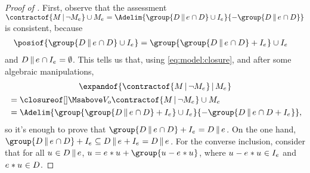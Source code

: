 \documentclass[preprint]{isipta2025}
\begin{document}
\begin{proof}[Proof of ]
First, observe that the assessment \(\contractof{\M\given\neg\eventM}\union\eventM=\Adelim{\group{\desirset\altcondon\eventopt\cap\desirset}\cup\eventindifset}{-\group{\desirset\altcondon\eventopt\cap\desirset}}\) is consistent, because
\begin{align*}
\posiof{\group{\desirset\altcondon\eventopt\cap\desirset}\cup\eventindifset}
&=\group{\group{\desirset\altcondon\eventopt\cap\desirset}+\eventindifset}\cup\eventindifset
\end{align*}
and \(\desirset\altcondon\eventopt\cap\eventindifset=\emptyset\).
This tells us that, using \cref{eq:model:closure}, and after some algebraic manipulations,
\begin{multline*}
\expandof{\contractof{\M\given\neg\eventM}\given\eventM}\\
\begin{aligned}
&=\Mclsbgof{\zeroM}{\contractof{\M\given\neg\eventM}\union\eventM}\\
&=\Adelim{\group{\group{\desirset\altcondon\eventopt\cap\desirset}+\eventindifset}\cup\eventindifset}{-\group{\desirset\altcondon\eventopt\cap\desirset+\eventindifset}},
\end{aligned}
\end{multline*}
so it's enough to prove that \(\group{\desirset\altcondon\eventopt\cap\desirset}+\eventindifset=\desirset\altcondon\eventopt\).
On the one hand, \(\group{\desirset\altcondon\eventopt\cap\desirset}+\eventindifset\subseteq\desirset\altcondon\eventopt+\eventindifset=\desirset\altcondon\eventopt\).
For the converse inclusion, consider that for all \(\opt\in\desirset\altcondon\eventopt\), \(\opt=\calledoff{\opt}+\group{\opt- \calledoff{\opt}}\), where \(u_{}-e_{}\ast u_{}\in I_{{e_{}}}\) and \(e_{}\ast u_{}\in D_{}\).
\end{proof}
\end{document}
